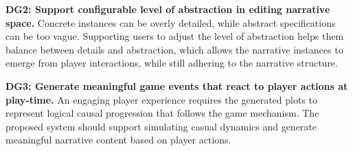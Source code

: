 \textbf{DG2: Support configurable level of abstraction in editing narrative space.} 
Concrete instances can be overly detailed, while abstract specifications can be too vague. Supporting users to adjust the level of abstraction helps them balance between details and abstraction, which allows the narrative instances to emerge from player interactions, while still adhering to the narrative structure. 



\textbf{DG3: Generate meaningful game events that react to player actions at play-time.} An engaging player experience requires the generated plots to represent logical causal progression that follows the game mechanism.
The proposed system should support simulating casual dynamics and generate meaningful narrative content based on player actions. 



